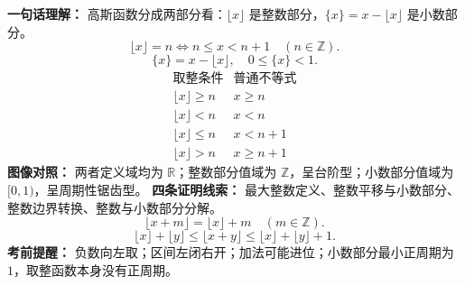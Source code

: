 \begin{summarybox}
\textbf{一句话理解：} 高斯函数分成两部分看：$\lfloor x\rfloor$ 是整数部分，$\{x\}=x-\lfloor x\rfloor$ 是小数部分。
\[\boxed{\lfloor x\rfloor=n\iff n\le x<n+1\quad(n\in\mathbb Z).}\]
\[\boxed{\{x\}=x-\lfloor x\rfloor,\quad 0\le \{x\}<1.}\]
\[\begin{array}{c|c}\text{取整条件}&\text{普通不等式}\\\hline \lfloor x\rfloor\ge n&x\ge n\\\lfloor x\rfloor<n&x<n\\\lfloor x\rfloor\le n&x<n+1\\\lfloor x\rfloor>n&x\ge n+1\end{array}\]
\textbf{图像对照：} 两者定义域均为 $\mathbb R$；整数部分值域为 $\mathbb Z$，呈台阶型；小数部分值域为 $[0,1)$，呈周期性锯齿型。
\textbf{四条证明线索：} 最大整数定义、整数平移与小数部分、整数边界转换、整数与小数部分分解。
\[\lfloor x+m\rfloor=\lfloor x\rfloor+m\quad(m\in\mathbb Z).\]
\[\lfloor x\rfloor+\lfloor y\rfloor\le\lfloor x+y\rfloor\le\lfloor x\rfloor+\lfloor y\rfloor+1.\]
\textbf{考前提醒：} 负数向左取；区间左闭右开；加法可能进位；小数部分最小正周期为 $1$，取整函数本身没有正周期。
\end{summarybox}
